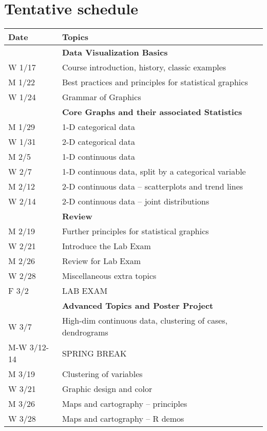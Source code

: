 \documentclass[11pt]{article}
\begin{document}
\newpage
\section*{Tentative schedule}
\begin{table}[h!]
\begin{tabular}{ll}
\textbf{Date} & \textbf{Topics}  \\ \hline
          		& \textbf{Data Visualization Basics} \\
W 1/17        & Course introduction, history, classic examples \\
M 1/22			  & Best practices and principles for statistical graphics \\ 
W 1/24        & Grammar of Graphics \\
\hline
          		& \textbf{Core Graphs and their associated Statistics} \\
M 1/29        & 1-D categorical data \\
W 1/31        & 2-D categorical data \\
M 2/5         & 1-D continuous data \\
W 2/7         & 1-D continuous data, split by a categorical variable \\
M 2/12        & 2-D continuous data -- scatterplots and trend lines \\
W 2/14        & 2-D continuous data -- joint distributions \\
\hline
          		& \textbf{Review} \\
M 2/19        & Further principles for statistical graphics \\
W 2/21        & Introduce the Lab Exam \\
M 2/26        & Review for Lab Exam \\
W 2/28        & Miscellaneous extra topics \\
F 3/2         & LAB EXAM \\
\hline
          		& \textbf{Advanced Topics and Poster Project} \\
W 3/7         & High-dim continuous data, clustering of cases, dendrograms \\
M-W 3/12-14   & SPRING BREAK \\
M 3/19        & Clustering of variables \\
W 3/21        & Graphic design and color \\
M 3/26        & Maps and cartography -- principles \\
W 3/28        & Maps and cartography -- R demos \\

\end{tabular}
\end{table}
\end{document}
